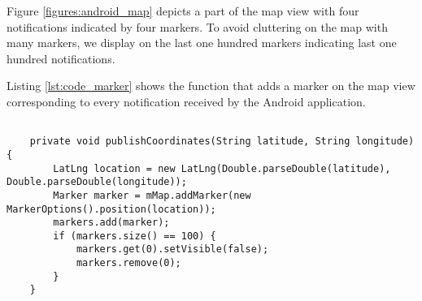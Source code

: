 Figure \ref{figures:android_map} depicts a part of the map view with four notifications indicated by four markers. To avoid cluttering on the map with many markers, we display on the last one hundred markers indicating last one hundred notifications.

Listing \ref{lst:code_marker} shows the function that adds a marker on the map view corresponding to every notification received by the Android application.

\bigskip
\begin{lstlisting}[style=JavaInputStyle,caption=Function to add marker on map, label={lst:code_marker}]

    private void publishCoordinates(String latitude, String longitude) {
        LatLng location = new LatLng(Double.parseDouble(latitude), Double.parseDouble(longitude));
        Marker marker = mMap.addMarker(new MarkerOptions().position(location));
        markers.add(marker);
        if (markers.size() == 100) {
            markers.get(0).setVisible(false);
            markers.remove(0);
        }
    }

\end{lstlisting}